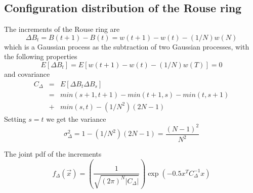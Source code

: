 \documentclass{report}
\begin{document}
\subsection{Configuration distribution of the Rouse ring}\label{subsection_configurationDistributionRouseRing}

The increments of the Rouse ring are
\begin{equation*}
\Delta B_t= B(t+1)-B(t)=w(t+1)-w(t)-(1/N)w(N)
\end{equation*}
which is a Gaussian process as the subtraction of two Gaussian processes, with the following properties
\begin{equation*}
E[\Delta B_t]=E[w(t+1)-w(t)-(1/N)w(T)]=0
\end{equation*}
and covariance
 \begin{eqnarray*}
 C_{\Delta} & = & E[\Delta B_t \Delta B_s]\\
  & = & min(s+1,t+1)-min(t+1,s)-min(t,s+1)\\
  &+ & min(s,t)-(1/N^2)(2N-1)
 \end{eqnarray*}
Setting $s=t $ we get the variance 
\begin{equation*}
\sigma^2_{\Delta}=1-(1/N^2)(2N-1)=\frac{(N-1)^2}{N^2}
\end{equation*}

The joint pdf of the increments
\begin{equation*}
f_\Delta(\vec{x}) = \left(\frac{1}{\sqrt{(2\pi)^N |C_\Delta|}}\right)\exp(-0.5x^TC_\Delta^{-1}x)
\end{equation*}
\end{document}
